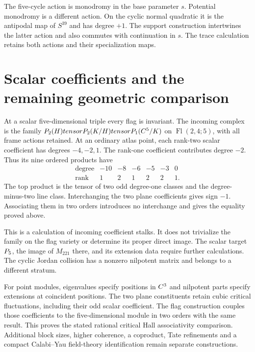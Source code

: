The five-cycle action is monodromy in the base parameter $s$.
Potential monodromy is a different action. On the cyclic normal
quadratic it is the antipodal map of $S^{39}$ and has degree $+1$.
The support construction intertwines the latter action and also
commutes with continuation in $s$. The trace calculation retains
both actions and their specialization maps.

\section{Scalar coefficients and the remaining geometric comparison}
\label{fl221:sec:scalar}

At a scalar five-dimensional triple every flag is invariant.
The incoming complex is the family
$P_2(H)tensorP_2(K/H)tensorP_1(C^5/K)$
on $\operatorname{Fl}(2,4;5)$, with all frame actions retained.
At an ordinary atlas point, each rank-two scalar coefficient has
degrees $-4,-2,1$. The rank-one coefficient contributes degree
$-2$. Thus its nine ordered products have
\[
\begin{array}{c|rrrrrr}
 \text{degree}&-10&-8&-6&-5&-3&0\\\hline
 \text{rank}&1&2&1&2&2&1.
\end{array}
\]
The top product is the tensor of two odd degree-one classes and
the degree-minus-two line class. Interchanging the two plane
coefficients gives sign $-1$. Associating them in two orders
introduces no interchange and gives the equality proved above.

This is a calculation of incoming coefficient stalks. It does not
trivialize the family on the flag variety or determine its proper
direct image. The scalar target $P_5$, the image of $M_{221}$
there, and its extension data require further calculations.
The cyclic Jordan collision has a nonzero nilpotent matrix and
belongs to a different stratum.

For point modules, eigenvalues specify positions in $C^3$ and
nilpotent parts specify extensions at coincident positions.
The two plane constituents retain cubic critical fluctuations,
including their odd scalar coefficient. The flag construction
couples those coefficients to the five-dimensional module in two
orders with the same result. This proves the stated rational
critical Hall associativity comparison. Additional block sizes,
higher coherence, a coproduct, Tate refinements and a compact
Calabi--Yau field-theory identification remain separate constructions.
